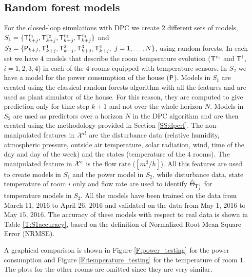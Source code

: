 \subsection{Random forest models}
\label{SS:randomForestsModels}
For the closed-loop simulations with DPC we create $2$ different sets of models, $S_1 = \{\mathsf{T}^{r_1}_{k+j},\mathsf{T}^{r_2}_{k+j},\mathsf{T}^{r_3}_{k+j},\mathsf{T}^{r_4}_{k+j}\}$ and $S_2 = \{\mathsf{P}_{k+j},\mathsf{T}^{1}_{k+j},\mathsf{T}^{2}_{k+j},\mathsf{T}^{3}_{k+j},\mathsf{T}^{4}_{k+j},\ j = 1,\ldots,N\}$, using random forests. In each set we have  $4$ models that describe the room temperature evolution ($\mathsf{T}^{r_i}$ and $\mathsf{T}^i$, $i=1,2,3,4$) in each of the $4$ rooms equipped with temperature sensors. In $S_2$ we have a model for the power consumption of the house ($\mathsf{P}$). Models in $S_1$ are created using the classical random forests algorithm with all the features and are used as plant simulator of the house. For this reason, they are computed to give prediction only for time step $k+1$ and not over the whole horizon $N$. Models in $S_2$ are used as predictors over a horizon $N$ in the DPC algorithm and are then created using the methodology provided in Section \ref{SS:dpcrf}. The non-manipulated features in $\mathcal{X}^d$ are the disturbance data (relative humidity, atmospheric pressure, outside air temperature, solar radiation, wind, time of the day and day of the week) and the states (temperature of the $4$ rooms). The manipulated feature in $\mathcal{X}^c$ is the flow rate ($[m^3/h]$). All this features are used to create models in $S_1$ and the power model in $S_2$, while disturbance data, state temperature of room $i$ only and flow rate are used to identify $\hat{\Theta}_{\mathsf{T}^i_j}$ for temperature models in $S_2$. All the models have been trained on the data from March $11$, $2016$ to April $26$, $2016$ and validated on the data from May $1$, $2016$ to May $15$, $2016$. The accuracy of these models with respect to real data is shown in Table \ref{T:S1accuracy}, based on the definition of Normalized Root Mean Square Error (NRMSE).

A graphical comparison is shown in Figure \ref{F:power_testing} for the power consumption and Figure \ref{F:temperature_testing} for the temperature of room $1$. The plots for the other rooms are omitted since they are very similar.


